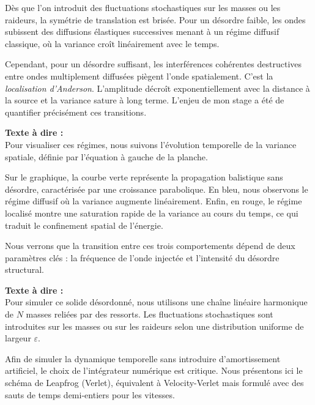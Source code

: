 \documentclass[11pt,a4paper]{article}
\begin{document}
\begin{tcolorbox}[colback=blue!5,colframe=blue!75!black,title=Slide 2 : Table des Matières --- 0:45 à 1:15]
\begin{tcolorbox}[colback=blue!5,colframe=blue!75!black,title=Slide 3 : Introduction : Phénomènes de transport vibratoire --- 2:00 à 3:00]
Dès que l'on introduit des fluctuations stochastiques sur les masses ou les raideurs, la symétrie de translation est brisée. Pour un désordre faible, les ondes subissent des diffusions élastiques successives menant à un régime diffusif classique, où la variance croît linéairement avec le temps. 

Cependant, pour un désordre suffisant, les interférences cohérentes destructives entre ondes multiplement diffusées piègent l'onde spatialement. C'est la \textit{localisation d'Anderson}. L'amplitude décroît exponentiellement avec la distance à la source et la variance sature à long terme. L'enjeu de mon stage a été de quantifier précisément ces transitions. \fg{}
\end{tcolorbox}

\newpage

\begin{tcolorbox}[colback=blue!5,colframe=blue!75!black,title=Slide 4 : Les trois régimes de transport ondulatoire --- 2:15 à 3:15]
\textbf{Texte à dire :} \\
\og  Pour visualiser ces régimes, nous suivons l'évolution temporelle de la variance spatiale, définie par l'équation à gauche de la planche. 

Sur le graphique, la courbe verte représente la propagation balistique sans désordre, caractérisée par une croissance parabolique. En bleu, nous observons le régime diffusif où la variance augmente linéairement. Enfin, en rouge, le régime localisé montre une saturation rapide de la variance au cours du temps, ce qui traduit le confinement spatial de l'énergie. 

Nous verrons que la transition entre ces trois comportements dépend de deux paramètres clés : la fréquence de l'onde injectée et l'intensité du désordre structural. \fg{}
\end{tcolorbox}

\begin{tcolorbox}[colback=blue!5,colframe=blue!75!black,title=Slide 5 : Réseau 1D Masse-Ressort \& Schéma Symplectique --- 3:15 à 4:15]
\textbf{Texte à dire :} \\
\og  Pour simuler ce solide désordonné, nous utilisons une chaîne linéaire harmonique de $N$ masses reliées par des ressorts. Les fluctuations stochastiques sont introduites sur les masses ou sur les raideurs selon une distribution uniforme de largeur $\varepsilon$.

Afin de simuler la dynamique temporelle sans introduire d'amortissement artificiel, le choix de l'intégrateur numérique est critique. Nous présentons ici le schéma de Leapfrog (Verlet), équivalent à Velocity-Verlet mais formulé avec des sauts de temps demi-entiers pour les vitesses. 


\end{tcolorbox}
\end{tcolorbox}
\end{document}
